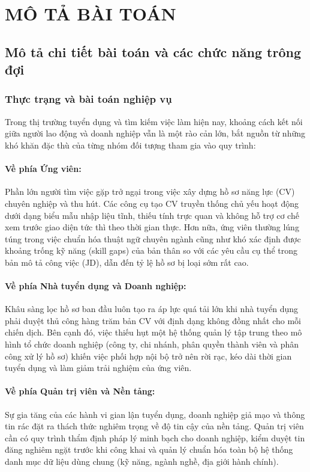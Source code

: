 
\newpage

\section{MÔ TẢ BÀI TOÁN}

\subsection{Mô tả chi tiết bài toán và các chức năng trông đợi}

\subsubsection{Thực trạng và bài toán nghiệp vụ}
Trong thị trường tuyển dụng và tìm kiếm việc làm hiện nay, khoảng cách kết nối giữa người lao động và doanh nghiệp vẫn là một rào cản lớn, bắt nguồn từ những khó khăn đặc thù của từng nhóm đối tượng tham gia vào quy trình:

\paragraph{Về phía Ứng viên:} 
Phần lớn người tìm việc gặp trở ngại trong việc xây dựng hồ sơ năng lực (CV) chuyên nghiệp và thu hút. Các công cụ tạo CV truyền thống chủ yếu hoạt động dưới dạng biểu mẫu nhập liệu tĩnh, thiếu tính trực quan và không hỗ trợ cơ chế xem trước giao diện tức thì theo thời gian thực. Hơn nữa, ứng viên thường lúng túng trong việc chuẩn hóa thuật ngữ chuyên ngành cũng như khó xác định được khoảng trống kỹ năng (skill gaps) của bản thân so với các yêu cầu cụ thể trong bản mô tả công việc (JD), dẫn đến tỷ lệ hồ sơ bị loại sớm rất cao.

\paragraph{Về phía Nhà tuyển dụng và Doanh nghiệp:}
Khâu sàng lọc hồ sơ ban đầu luôn tạo ra áp lực quá tải lớn khi nhà tuyển dụng phải duyệt thủ công hàng trăm bản CV với định dạng không đồng nhất cho mỗi chiến dịch. Bên cạnh đó, việc thiếu hụt một hệ thống quản lý tập trung theo mô hình tổ chức doanh nghiệp (công ty, chi nhánh, phân quyền thành viên và phân công xử lý hồ sơ) khiến việc phối hợp nội bộ trở nên rời rạc, kéo dài thời gian tuyển dụng và làm giảm trải nghiệm của ứng viên.

\paragraph{Về phía Quản trị viên và Nền tảng:}
Sự gia tăng của các hành vi gian lận tuyển dụng, doanh nghiệp giả mạo và thông tin rác đặt ra thách thức nghiêm trọng về độ tin cậy của nền tảng. Quản trị viên cần có quy trình thẩm định pháp lý minh bạch cho doanh nghiệp, kiểm duyệt tin đăng nghiêm ngặt trước khi công khai và quản lý chuẩn hóa toàn bộ hệ thống danh mục dữ liệu dùng chung (kỹ năng, ngành nghề, địa giới hành chính).


